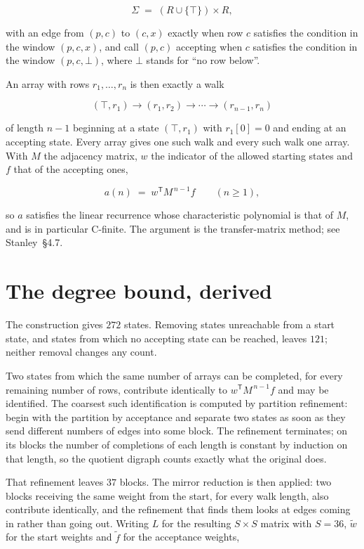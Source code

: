 \documentclass[11pt]{article}
\theoremstyle{definition}
\begin{document}
\[\Sigma \;=\; (R \cup \{\top\}) \times R,\]

with an edge from $(p,c)$ to $(c,x)$ exactly when row $c$ satisfies the condition in the window $(p,c,x)$, and call $(p,c)$ accepting when $c$ satisfies the condition in the window $(p,c,\bot)$, where $\bot$ stands for ``no row below''.

An array with rows $r_1,\dots,r_n$ is then exactly a walk

\[(\top,r_1) \to (r_1,r_2) \to \cdots \to (r_{n-1},r_n)\]

of length $n-1$ beginning at a state $(\top,r_1)$ with $r_1[0]=0$ and ending at an accepting state. Every array gives one such walk and every such walk one array. With $M$ the adjacency matrix, $w$ the indicator of the allowed starting states and $f$ that of the accepting ones,

\[a(n) \;=\; w^{\mathsf T} M^{\,n-1} f \qquad (n \ge 1),\]

so $a$ satisfies the linear recurrence whose characteristic polynomial is that of $M$, and is in particular C-finite. The argument is the transfer-matrix method; see Stanley~\S4.7.

\section{The degree bound, derived}

The construction gives $272$ states. Removing states unreachable from a start state, and states from which no accepting state can be reached, leaves $121$; neither removal changes any count.

Two states from which the same number of arrays can be completed, for every remaining number of rows, contribute identically to $w^{\mathsf T}M^{\,n-1}f$ and may be identified. The coarsest such identification is computed by partition refinement: begin with the partition by acceptance and separate two states as soon as they send different numbers of edges into some block. The refinement terminates; on its blocks the number of completions of each length is constant by induction on that length, so the quotient digraph counts exactly what the original does.

That refinement leaves $37$ blocks. The mirror reduction is then applied: two blocks receiving the same weight from the start, for every walk length, also contribute identically, and the refinement that finds them looks at edges coming in rather than going out. Writing $L$ for the resulting $S \times S$ matrix with $S = 36$, $\tilde w$ for the start weights and $\tilde f$ for the acceptance weights,
\end{document}
